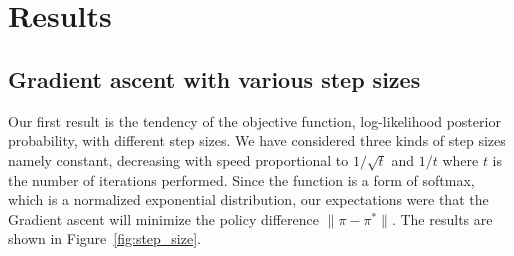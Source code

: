 \documentclass[10pt,a4paper]{article}
\begin{document}
\section{Results}

\subsection{Gradient ascent with various step sizes}
Our first result is the tendency of the objective function, log-likelihood posterior probability, with different step sizes. We have considered three kinds of step sizes namely constant, decreasing with speed proportional to $1/\sqrt{t}$ and $1/t$ where $t$ is the number of iterations performed. Since the function is a form of softmax, which is a normalized exponential distribution, our expectations were that the Gradient ascent will minimize the policy difference $\| \pi - \pi^{*} \|$. The results are shown in Figure~\ref{fig:step_size}.
\end{document}
